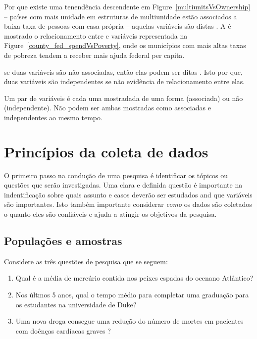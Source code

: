 Por que existe uma tenendência descendente em Figure~\ref{multiunitsVsOwnership} -- países com mais unidade em estruturas de multiunidade estão associados a baixa taxa de pessoas com casa própria -- aquelas variáveis são distas . A  é mostrado o relacionamento entre e  variáveis representada na Figure~\ref{county_fed_spendVsPoverty}, onde os municípios com mais altas taxas de pobreza tendem a receber mais ajuda federal per capita.

se duas variáveis são não associadas, então elas podem ser ditas . Isto por que, duas variáveis são independentes se não evidência de relacionamento entre elas.


\begin{termBox}{
Um par de variáveis é cada uma mostradada de uma forma (associada) ou não (independente). Não podem ser ambas mostradas como associadas e independentes ao mesmo tempo.}
\end{termBox}


\section[Princípios da coleta de dados]{Princípios da coleta de dados }
\label{overviewOfDataCollectionPrinciples}


O primeiro passo na condução de uma pesquisa é identificar os tópicos ou questões que serão investigadas. Uma clara e definida questão é importante na indentificação sobre quais assunto e casos deverão ser estudados and que variáveis são importantes. Isto também importante considerar \emph{como} os dados são coletados o quanto eles são confiáveis e ajuda a atingir os objetivos da pesquisa.

\subsection{Populações e amostras}
\label{populationsAndSamples}

Considere as três questões de pesquisa que se seguem:

\begin{enumerate}
\setlength{\itemsep}{0mm}
\item Qual é a média de mercúrio contida nos peixes espadas do ocenano Atlântico?
\item\label{timeToGraduationQuestionForUCLAStudents} Nos últmos 5 anos, qual o tempo médio para completar uma graduação para os estudantes na universidade de Duke?
\item\label{identifyPopulationOfStentStudy} Uma nova droga consegue uma redução do número de mortes em pacientes com doênças cardíacas graves ?
\end{enumerate}

